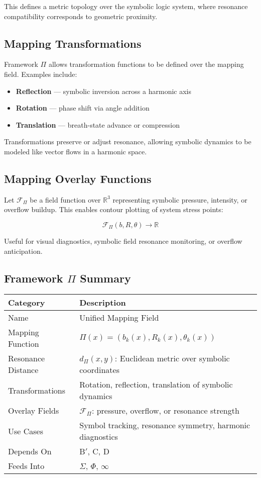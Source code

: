 This defines a metric topology over the symbolic logic system, where resonance compatibility corresponds to geometric proximity.

\subsection*{Mapping Transformations}

Framework $\Pi$ allows transformation functions to be defined over the mapping field. Examples include:

\begin{itemize}
  \item \textbf{Reflection} — symbolic inversion across a harmonic axis
  \item \textbf{Rotation} — phase shift via angle addition
  \item \textbf{Translation} — breath-state advance or compression
\end{itemize}

Transformations preserve or adjust resonance, allowing symbolic dynamics to be modeled like vector flows in a harmonic space.

\subsection*{Mapping Overlay Functions}

Let $\mathcal{F}_\Pi$ be a field function over $\mathbb{R}^3$ representing symbolic pressure, intensity, or overflow buildup. This enables contour plotting of system stress points:

\[
\mathcal{F}_\Pi(b, R, \theta) \rightarrow \mathbb{R}
\]

Useful for visual diagnostics, symbolic field resonance monitoring, or overflow anticipation.

\subsection*{Framework $\Pi$ Summary}

\begin{center}
\begin{tabular}{|l|l|}
\hline
\textbf{Category} & \textbf{Description} \\
\hline
Name & Unified Mapping Field \\
Mapping Function & $\Pi(x) = (b_k(x), R_k(x), \theta_k(x))$ \\
Resonance Distance & $d_\Pi(x,y)$: Euclidean metric over symbolic coordinates \\
Transformations & Rotation, reflection, translation of symbolic dynamics \\
Overlay Fields & $\mathcal{F}_\Pi$: pressure, overflow, or resonance strength \\
Use Cases & Symbol tracking, resonance symmetry, harmonic diagnostics \\
Depends On & B$'$, C, D \\
Feeds Into & $\Sigma$, $\Phi$, $\infty$ \\
\hline
\end{tabular}
\end{center}

